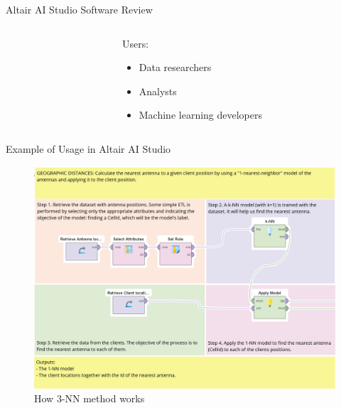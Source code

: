 \begin{frame}{Altair AI Studio Software Review}
\begin{columns}
\begin{column}{0.4\paperwidth}
        \end{column}
        \begin{column}{0.4\paperwidth}
            \begin{block}{Users:}
                \begin{itemize}
                    \item Data researchers
                    \item Analysts
                    \item Machine learning developers
                \end{itemize}
            \end{block}
        \end{column}
    \end{columns}
\end{frame}

\begin{frame}{Example of Usage in Altair AI Studio}
    \begin{figure}
        \includegraphics[height=0.6\paperheight]{images/Altair/Altair_proc_exmpl.png}
        \caption{How 3-NN method works}
    \end{figure}
\end{frame}
